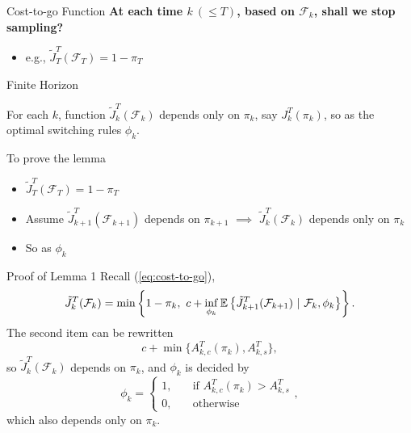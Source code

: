 \documentclass[xcolor={svgnames}]{beamer}
\begin{document}
\begin{frame}{Cost-to-go Function}
  \textbf{At each time $k~(\le T)$, based on $\mathcal{F}_k$, shall we stop sampling?}

  \bigskip


  \begin{itemize}
    \item<4-> e.g., $\tilde{J}^T_{T}(\mathcal{F}_T) = 1 - \pi_T$
  \end{itemize}
\end{frame}
\begin{frame}{Finite Horizon}
  \begin{lemma}
    For each $k$, function $\tilde{J}^T_{k}(\mathcal{F}_k)$ depends only on $\pi_k$, say $J^T_{k}(\pi_k)$, so as the optimal switching rules $\phi_k$.
  \end{lemma}
  \pause

  To prove the lemma
  \begin{itemize}[<+->]
    \item[\checkmark] $\tilde{J}^T_{T}(\mathcal{F}_T) = 1 - \pi_T$
    \item Assume $\tilde{J}^T_{k+1}(\mathcal{F}_{k+1})$ depends on $\pi_{k+1}$ $\implies$ $\tilde{J}^T_{k}(\mathcal{F}_{k})$ depends only on $\pi_k$
    \item So as $\phi_k$
  \end{itemize}
\end{frame}
\begin{frame}{Proof of Lemma 1}
  Recall (\ref{eq:cost-to-go}),
  $$
  \tilde{J}^T_{k}(\mathcal{F}_k) = \min\left\{
  1 - \pi_k,
  ~c + \inf_{\phi_k}\mathbb{E}{}\left\{
                  \tilde{J}^T_{k+1}(\mathcal{F}_{k+1}) ~|~ \mathcal{F}_k, \phi_k
                \right\}
  \right\}.
  $$
  The second item can be rewritten
  \[
    c + \min\{A^T_{k,c}(\pi_k), A^T_{k,s}\},
  \]
  so $\tilde{J}^T_{k}(\mathcal{F}_k)$ depends on $\pi_k$, and $\phi_k$ is decided by
  \begin{equation}
    \phi_k =
    \begin{cases}
      1, &\quad \text{if } A^T_{k,c}(\pi_k) > A^T_{k,s} \\
      0, &\quad \text{otherwise}
    \end{cases},
  \end{equation}
  which also depends only on $\pi_k$.
\end{frame}
\end{document}
